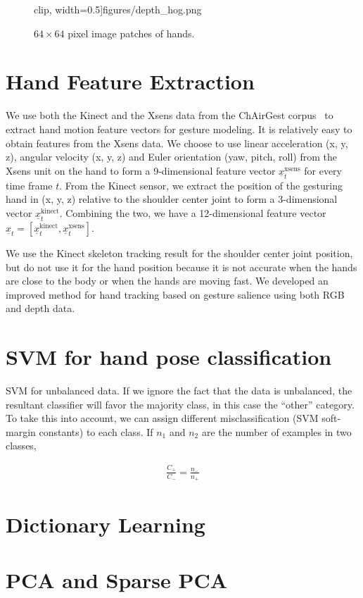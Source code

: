 \begin{figure}[h]
{  clip, width=0.5\textwidth]{figures/depth_hog.png}
  }
  \caption{$64\times64$ pixel image patches of hands.} \label{fig:hand}
\end{figure}

\section{Hand Feature Extraction}
We use both the Kinect and the Xsens data from the ChAirGest corpus~\cite{Ruffieux2013} to
extract hand motion feature vectors for gesture modeling.
It is relatively easy to obtain features from the Xsens data. We choose to use linear
acceleration (x, y, z), angular velocity (x, y, z) and Euler orientation (yaw, pitch, roll)
from the Xsens unit on the hand to form a 9-dimensional feature vector $\underline{x}_t^{\text{xsens}}$
for every time frame $t$.
From the Kinect sensor, we extract the position of the gesturing hand in (x, y, z) relative to
the shoulder center joint to
form a 3-dimensional vector $\underline{x}_t^{\text{kinect}}$. Combining the two, we
have a 12-dimensional feature vector $\underline{x}_t = [\underline{x}^\text{kinect}_t, \underline{x}^\text{xsens}_t]$.

We use the Kinect skeleton tracking result for the shoulder center joint position,
but do not use it for the hand position because
it is not accurate when the hands are close to the body or when the hands are moving fast.
We developed an improved method for hand tracking based on gesture salience using both
RGB and depth data.

\section{SVM for hand pose classification}
SVM for unbalanced data. \cite{ben2010}
If we ignore the  fact that the data is unbalanced, the resultant classifier
will favor the majority class, in this case the ``other'' category. To take this
into account, we can assign different misclassification (SVM soft-margin
constants) to each class. If $n_1$ and $n_2$ are the number of examples in two
classes, 

\begin{align}
\frac{C_+}{C_-} = \frac{n_-}{n_+}
\end{align}

\section{Dictionary Learning}

\section{PCA and Sparse PCA}
